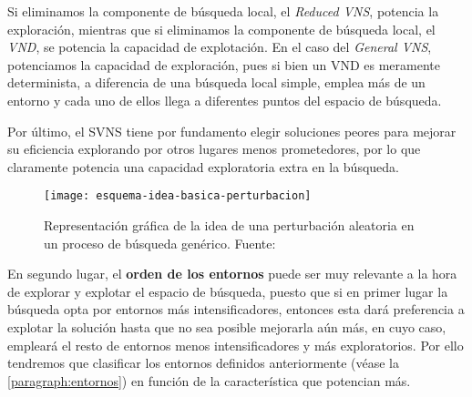 Si eliminamos la componente de búsqueda local, el \textit{Reduced VNS}, potencia la exploración, mientras que si eliminamos la componente de búsqueda local, el \textit{VND}, se potencia la capacidad de explotación.
En el caso del \textit{General VNS}, potenciamos la capacidad de exploración, pues si bien un VND es meramente determinista, a diferencia de una búsqueda local simple, emplea más de un entorno y cada uno de ellos llega a diferentes puntos del espacio de búsqueda.

Por último, el SVNS tiene por fundamento elegir soluciones peores para mejorar su eficiencia explorando por otros lugares menos prometedores, por lo que claramente potencia una capacidad exploratoria extra en la búsqueda.

\begin{figure}
    \centering    \texttt{[image: esquema-idea-basica-perturbacion]}
    \caption[Representación gráfica de la idea de una perturbación aleatoria en un proceso de búsqueda genérico]{Representación gráfica de la idea de una perturbación aleatoria en un proceso de búsqueda genérico. Fuente:~\cite{sota:metaheuristicas-design-impl}}
    \label{fig:esquema-idea-basica-perturbacion}
\end{figure}

En segundo lugar, el \textbf{orden de los entornos} puede ser muy relevante a la hora de explorar y explotar el espacio de búsqueda, puesto que si en primer lugar la búsqueda opta por entornos más intensificadores, entonces esta dará preferencia a explotar la solución hasta que no sea posible mejorarla aún más, en cuyo caso, empleará el resto de entornos menos intensificadores y más exploratorios. Por ello tendremos que clasificar los entornos definidos anteriormente (véase la \autoref{paragraph:entornos}) en función de la característica que potencian más.


